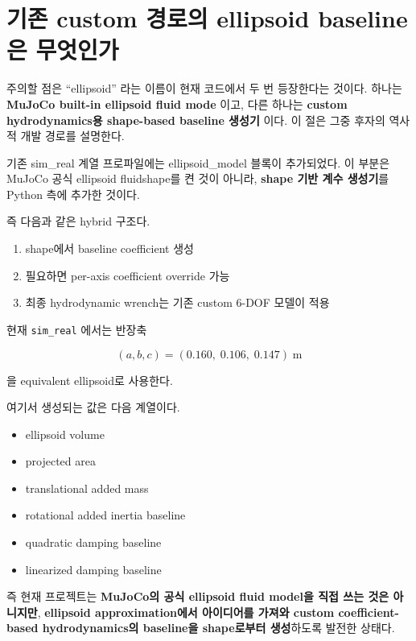 \documentclass[11pt,a4paper]{article}
\begin{document}
\section{기존 custom 경로의 ellipsoid baseline은 무엇인가}

주의할 점은 ``ellipsoid'' 라는 이름이 현재 코드에서 두 번 등장한다는 것이다. 하나는 \textbf{MuJoCo built-in ellipsoid fluid mode} 이고, 다른 하나는 \textbf{custom hydrodynamics용 shape-based baseline 생성기} 이다. 이 절은 그중 후자의 역사적 개발 경로를 설명한다.

기존 sim\_real 계열 프로파일에는 ellipsoid\_model 블록이 추가되었다.
이 부분은 MuJoCo 공식 ellipsoid fluidshape를 켠 것이 아니라,
\textbf{shape 기반 계수 생성기}를 Python 측에 추가한 것이다.

즉 다음과 같은 hybrid 구조다.

\begin{enumerate}[leftmargin=2em]
  \item shape에서 baseline coefficient 생성
  \item 필요하면 per-axis coefficient override 가능
  \item 최종 hydrodynamic wrench는 기존 custom 6-DOF 모델이 적용
\end{enumerate}

현재 \texttt{sim\_real} 에서는 반장축

\begin{equation}
(a,b,c) = (0.160,\;0.106,\;0.147)\;\text{m}
\end{equation}

을 equivalent ellipsoid로 사용한다.

여기서 생성되는 값은 다음 계열이다.

\begin{itemize}[leftmargin=2em]
  \item ellipsoid volume
  \item projected area
  \item translational added mass
  \item rotational added inertia baseline
  \item quadratic damping baseline
  \item linearized damping baseline
\end{itemize}

즉 현재 프로젝트는 \textbf{MuJoCo의 공식 ellipsoid fluid model을 직접 쓰는 것은 아니지만}, \textbf{ellipsoid approximation에서 아이디어를 가져와 custom coefficient-based hydrodynamics의 baseline을 shape로부터 생성}하도록 발전한 상태다.
\end{document}
